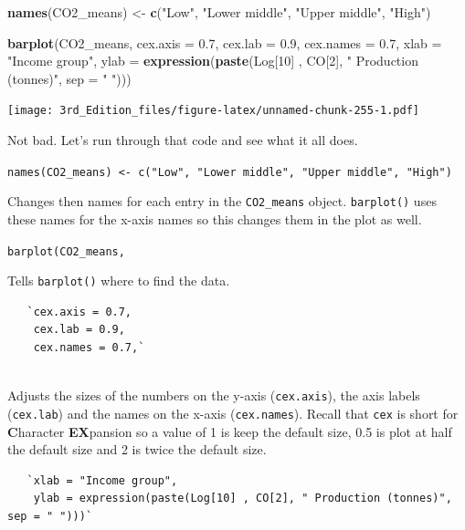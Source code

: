\documentclass[
]{book}
\newenvironment{Shaded}{\begin{snugshade}}{\end{snugshade}}
\newcommand{\DataTypeTok}[1]{\textcolor[rgb]{0.13,0.29,0.53}{#1}}
\newcommand{\DecValTok}[1]{\textcolor[rgb]{0.00,0.00,0.81}{#1}}
\newcommand{\FloatTok}[1]{\textcolor[rgb]{0.00,0.00,0.81}{#1}}
\newcommand{\KeywordTok}[1]{\textcolor[rgb]{0.13,0.29,0.53}{\textbf{#1}}}
\newcommand{\NormalTok}[1]{#1}
\newcommand{\StringTok}[1]{\textcolor[rgb]{0.31,0.60,0.02}{#1}}
\begin{document}
\begin{Shaded}
\begin{Highlighting}[]

\KeywordTok{names}\NormalTok{(CO2_means) <-}\StringTok{ }\KeywordTok{c}\NormalTok{(}\StringTok{"Low"}\NormalTok{, }\StringTok{"Lower middle"}\NormalTok{, }\StringTok{"Upper middle"}\NormalTok{, }\StringTok{"High"}\NormalTok{)}

\KeywordTok{barplot}\NormalTok{(CO2_means,}
        \DataTypeTok{cex.axis =} \FloatTok{0.7}\NormalTok{,}
        \DataTypeTok{cex.lab =} \FloatTok{0.9}\NormalTok{,}
        \DataTypeTok{cex.names =} \FloatTok{0.7}\NormalTok{,}
        \DataTypeTok{xlab =} \StringTok{"Income group"}\NormalTok{,}
        \DataTypeTok{ylab =} \KeywordTok{expression}\NormalTok{(}\KeywordTok{paste}\NormalTok{(Log[}\DecValTok{10}\NormalTok{] , CO[}\DecValTok{2}\NormalTok{], }\StringTok{" Production (tonnes)"}\NormalTok{, }\DataTypeTok{sep =} \StringTok{" "}\NormalTok{)))}
\end{Highlighting}
\end{Shaded}

\texttt{[image: 3rd\_Edition\_files/figure-latex/unnamed-chunk-255-1.pdf]}

Not bad. Let's run through that code and see what it all does.

\texttt{names(CO2\_means)\ \textless{}-\ c("Low",\ "Lower\ middle",\ "Upper\ middle",\ "High")}

Changes then names for each entry in the \texttt{CO2\_means} object. \texttt{barplot()} uses these names for the x-axis names so this changes them in the plot as well.

\texttt{barplot(CO2\_means,}

Tells \texttt{barplot()} where to find the data.

\begin{verbatim}
   `cex.axis = 0.7,
    cex.lab = 0.9,
    cex.names = 0.7,`
    
\end{verbatim}

Adjusts the sizes of the numbers on the y-axis (\texttt{cex.axis}), the axis labels (\texttt{cex.lab}) and the names on the x-axis (\texttt{cex.names}). Recall that \texttt{cex} is short for \textbf{C}haracter \textbf{EX}pansion so a value of 1 is keep the default size, 0.5 is plot at half the default size and 2 is twice the default size.

\begin{verbatim}
   `xlab = "Income group",
    ylab = expression(paste(Log[10] , CO[2], " Production (tonnes)", sep = " ")))`
    
\end{verbatim}
\end{document}
